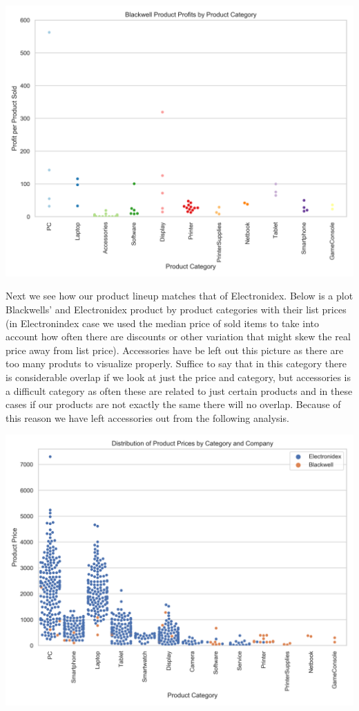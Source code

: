 \documentclass[12pt,a4paper,leqno]{report}
\theoremstyle{plain}
\theoremstyle{definition}
\theoremstyle{remark}
\begin{document}
\bigskip
{
    \centering
    \includegraphics[width=\textwidth,height=\textheight,keepaspectratio]{blackwell_product_profitability_distribution_by_category.png}
    \par
}
\bigskip

Next we see how our product lineup matches that of Electronidex. Below is a plot Blackwells' and Electronidex
product by product categories with their list prices (in Electronindex case we used the median price of sold items
to take into account how often there are discounts or other variation that might skew the real price away from list price).
Accessories have be left out this picture as there are too many produts to visualize properly. Suffice to say
that in this category there is considerable overlap if we look at just the price and category, but
accessories is a difficult category as often these are related to just certain products and in these cases
if our products are not exactly the same there will no overlap. Because of this reason we have left
accessories out from the following analysis.

\bigskip
{
    \centering
    \includegraphics[width=\textwidth,height=\textheight,keepaspectratio]{product_prices_distribution_by_category_and_company.png}
    \par
}
\bigskip
\end{document}
